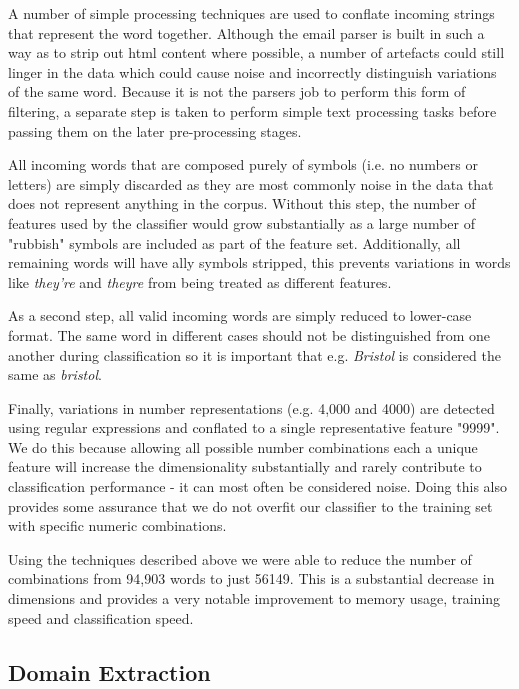 A number of simple processing techniques are used to conflate incoming strings that represent the word together. Although the email parser is built in such a way as to strip out html content where possible, a number of artefacts could still linger in the data which could cause noise and incorrectly distinguish variations of the same word. Because it is not the parsers job to perform this form of filtering, a separate step is taken to perform simple text processing tasks before passing them on the later pre-processing stages.

All incoming words that are composed purely of symbols (i.e. no numbers or letters) are simply discarded as they are most commonly noise in the data that does not represent anything in the corpus. Without this step, the number of features used by the classifier would grow substantially as a large number of "rubbish" symbols are included as part of the feature set. Additionally, all remaining words will have ally symbols stripped, this prevents variations in words like {\it they're} and {\it theyre} from being treated as different features.

As a second step, all valid incoming words are simply reduced to lower-case format. The same word in different cases should not be distinguished from one another during classification so it is important that e.g. {\it Bristol} is considered the same as {\it bristol}.

Finally, variations in number representations (e.g. 4,000 and 4000) are detected using regular expressions and conflated to a single representative feature "9999". We do this because allowing all possible number combinations each a unique feature will increase the dimensionality substantially and rarely contribute to classification performance - it can most often be considered noise. Doing this also provides some assurance that we do not overfit our classifier to the training set with specific numeric combinations.

Using the techniques described above we were able to reduce the number of  combinations from 94,903 words to just 56149. This is a substantial decrease in dimensions and provides a very notable improvement to memory usage, training speed and classification speed. 


\subsection{Domain Extraction}

